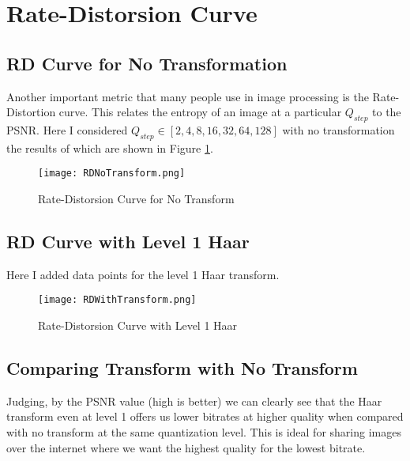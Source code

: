 \section{Rate-Distorsion Curve}
\subsection{RD Curve for No Transformation}
Another important metric that many people use in image processing is the Rate-Distortion curve. This relates the entropy of an image at a particular $Q_{step}$ to the PSNR. Here I considered $Q_{step} \in [2, 4, 8, 16, 32, 64, 128]$ with no transformation the results of which are shown in Figure \ref{fig:RDNoTransform}.
\begin{figure}[H]
    \texttt{[image: RDNoTransform.png]}
    \centering
    \caption{Rate-Distorsion Curve for No Transform}
    \label{fig:RDNoTransform}
\end{figure}

\subsection{RD Curve with Level 1 Haar}
Here I added data points for the level 1 Haar transform. 

\begin{figure}[H]
    \texttt{[image: RDWithTransform.png]}
    \centering
    \caption{Rate-Distorsion Curve with Level 1 Haar}
    \label{fig:RDWithTransform}
\end{figure}

\subsection{Comparing Transform with No Transform}
Judging, by the PSNR value (high is better) we can clearly see that the Haar transform even at level 1 offers us lower bitrates at higher quality when compared with no transform at the same quantization level. This is ideal for sharing images over the internet where we want the highest quality for the lowest bitrate.